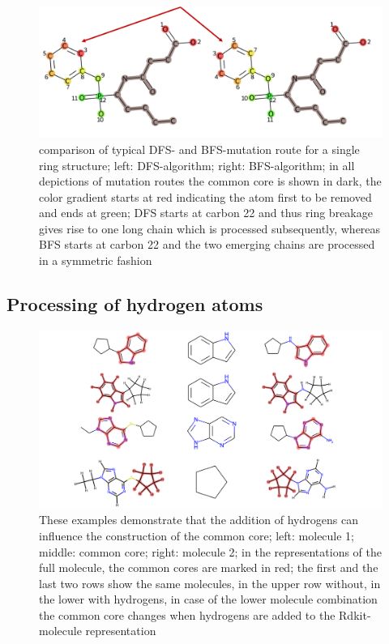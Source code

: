 \begin{figure}
\includegraphics[scale=1.4]{simple_ring_exampledfs.png}

\caption{comparison of typical DFS- and BFS-mutation route for a single ring structure; left: DFS-algorithm; right: BFS-algorithm; in all depictions of mutation routes the common core is shown in dark, the color gradient starts at red indicating the atom first to be removed and ends at green; DFS
starts at carbon 22 and thus ring breakage gives rise to one long
chain which is processed subsequently, whereas BFS starts at carbon
22 and the two emerging chains are processed in a symmetric fashion
}

\end{figure}


\subsection{Processing of hydrogen atoms}

\begin{figure}
	
	\includegraphics[scale=0.35]{hydrogens_plus_minus}
	\caption{These examples demonstrate that the addition of hydrogens can influence the construction of the common core; left: molecule 1; middle: common core; right: molecule 2; in the representations of the full molecule, the common cores are marked in red; the first
		and the last two rows show the same molecules, in the upper row without,
		in the lower with hydrogens, in case of the lower molecule combination
		the common core changes when hydrogens are added to the Rdkit-molecule
		representation }
		\label{fig:hydrogen_effect}
	\end{figure}


